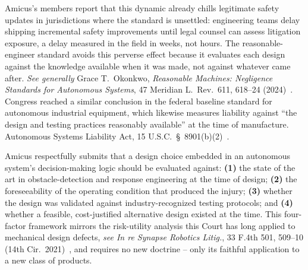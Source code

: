 Amicus's members report that this dynamic already chills legitimate safety updates in jurisdictions where the standard is unsettled: engineering teams delay shipping incremental safety improvements until legal counsel can assess litigation exposure, a delay measured in the field in weeks, not hours. The reasonable-engineer standard avoids this perverse effect because it evaluates each design against the knowledge available when it was made, not against whatever came after. \emph{See generally} Grace T.\ Okonkwo, \emph{Reasonable Machines: Negligence Standards for Autonomous Systems}, 47 Meridian L.\ Rev.\ 611, 618--24 (2024)~\cite{merlaw2024}. Congress reached a similar conclusion in the federal baseline standard for autonomous industrial equipment, which likewise measures liability against ``the design and testing practices reasonably available'' at the time of manufacture. Autonomous Systems Liability Act, 15 U.S.C.\ \S\ 8901(b)(2)~\cite{asla}.

\medskip
\begin{tcolorbox}[courtbox,title={The Proposed Reasonable-Engineer Test}]
\small
Amicus respectfully submits that a design choice embedded in an autonomous system's decision-making logic should be evaluated against: \textbf{(1)} the state of the art in obstacle-detection and response engineering at the time of design; \textbf{(2)} the foreseeability of the operating condition that produced the injury; \textbf{(3)} whether the design was validated against industry-recognized testing protocols; and \textbf{(4)} whether a feasible, cost-justified alternative design existed at the time. This four-factor framework mirrors the risk-utility analysis this Court has long applied to mechanical design defects, \emph{see In re Synapse Robotics Litig.}, 33 F.4th 501, 509--10 (14th Cir.\ 2021)~\cite{synapselitig2021}, and requires no new doctrine -- only its faithful application to a new class of products.
\end{tcolorbox}
